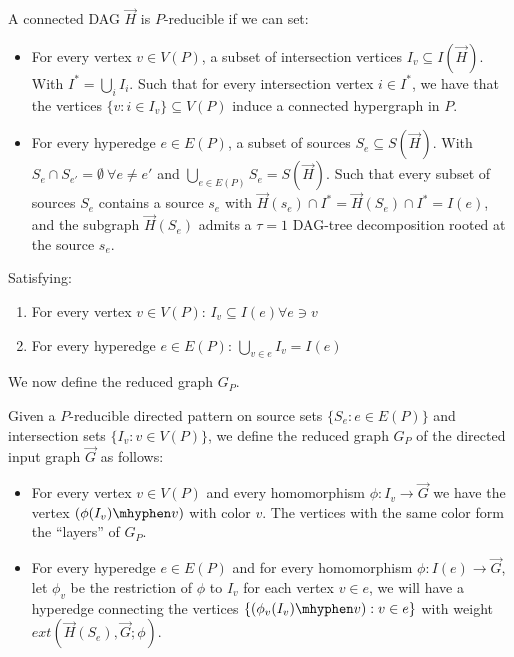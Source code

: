 \documentclass[a4paper,UKenglish,cleveref, autoref, numberwithinsect, thm-restate]{lipics-v2021}
\newcommand{\reducible}[1]{${#1}$-reducible}
\newcommand{\reduced}[1]{G_{#1}}
\newcommand{\extension}[3]{ext\left(#1,#2;#3\right)}
\newcommand{\dtw}{\tau}
\newcommand{\dagtree}{DAG-tree decomposition}
\begin{document}
	\begin{definition} [\reducible{P}] \label{def:reducible}
	A connected DAG $\vec{H}$ is \reducible{P} if we can set:
	\begin{itemize}
		\item For every vertex $v \in V(P)$, a subset of intersection vertices $I_v \subseteq I(\vec{H})$. With $I^*=\bigcup_i I_i$. Such that for every intersection vertex $i \in I^*$, we have that the vertices $\{v : i \in I_v\} \subseteq V(P)$ induce a connected hypergraph in $P$.
		
		\item For every hyperedge $e \in E(P)$, a subset of sources $S_e \subseteq S(\vec{H})$. With $S_e \cap S_{e'} =\emptyset\ \forall e\neq e'$ and $\bigcup_{e\in E(P)} S_e = S(\vec{H})$. Such that every subset of sources $S_e$ contains a source $s_e$ with $\vec{H}(s_e) \cap I^* = \vec{H}(S_e) \cap I^* = I(e)$, and the subgraph $\vec{H}(S_e)$ admits a $\dtw=1$ \dagtree{} rooted at the source $s_e$.
		\end{itemize}
		Satisfying:
		\begin{enumerate}
			\item  For every vertex $v \in V(P)$: $I_v \subseteq I(e) \forall e \ni v$
			\item For every hyperedge $e \in E(P)$: $\bigcup_{v \in e} I_v = I(e)$
		\end{enumerate}
	
	\end{definition}

	We now define the reduced graph $\reduced{P}$.

	\begin{definition} [Reduced graph $\reduced{P}$]  \label{def:reduced_graph} 
		Given a \reducible{P} directed pattern on source sets $\{S_e : e \in E(P)\}$ and intersection sets $\{I_v : v \in V(P)\}$, we define the reduced graph $\reduced{P}$ of the directed input graph $\vec{G}$ as follows:
		\begin{itemize}
			\item For every vertex $v\in V(P)$ and every homomorphism $\phi: I_{v} \to \vec{G}$ we have the vertex $(\phi(I_{v})\mhyphen v)$ with color $v$. The vertices with the same color form the ``layers'' of $\reduced{P}$.
			\item For every hyperedge $e\in E(P)$ and for every homomorphism $\phi: I(e) \to \vec{G}$, let $\phi_v$ be the restriction of $\phi$ to $I_v$ for each vertex $v \in e$, we will have a hyperedge connecting the vertices $\{(\phi_v(I_v) \mhyphen v) : v\in e\}$ with weight $\extension{\vec{H}(S_e)}{\vec{G}}{\phi}$.
		\end{itemize}
	\end{definition}
\end{document}
